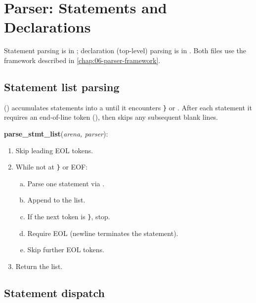 \chapter{Parser: Statements and Declarations}
\label{chap:08-parser-stmts}

\pnum
Statement parsing is in ; declaration (top-level) parsing
is in .  Both files use the framework described in
\cref{chap:06-parser-framework}.

\section{Statement list parsing}
\label{sec:par-stmtlist}

\pnum
{} ()
accumulates statements into a  until it encounters \texttt{\}}
or .  After each statement it requires an end-of-line token
(), then skips any subsequent blank lines.

\begin{algorithm}
\textbf{parse\_stmt\_list}(\textit{arena, parser}):
\begin{enumerate}
\item Skip leading EOL tokens.
\item While not at \texttt{\}} or EOF:
  \begin{enumerate}[(a)]
  \item Parse one statement via .
  \item Append to the list.
  \item If the next token is \texttt{\}}, stop.
  \item Require EOL (newline terminates the statement).
  \item Skip further EOL tokens.
  \end{enumerate}
\item Return the list.
\end{enumerate}
\end{algorithm}

\section{Statement dispatch}
\label{sec:par-stmt-dispatch}

